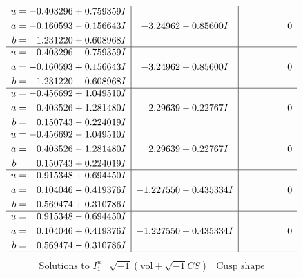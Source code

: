 \documentclass[1p]{elsarticle_modified}
\theoremstyle{definition}
\newcommand{\I}{\sqrt{-1}}
\begin{document}
$$\begin{array}{c|c|c}
\begin{aligned}
u &= -0.403296 + 0.759359 I \\
a &= -0.160593 - 0.156643 I \\
b &= \phantom{-}1.231220 + 0.608968 I\end{aligned}
 & -3.24962 - 0.85600 I & \phantom{-0.000000 } 0 \\ \hline\begin{aligned}
u &= -0.403296 - 0.759359 I \\
a &= -0.160593 + 0.156643 I \\
b &= \phantom{-}1.231220 - 0.608968 I\end{aligned}
 & -3.24962 + 0.85600 I & \phantom{-0.000000 } 0 \\ \hline\begin{aligned}
u &= -0.456692 + 1.049510 I \\
a &= \phantom{-}0.403526 + 1.281480 I \\
b &= \phantom{-}0.150743 - 0.224019 I\end{aligned}
 & \phantom{-}2.29639 - 0.22767 I & \phantom{-0.000000 } 0 \\ \hline\begin{aligned}
u &= -0.456692 - 1.049510 I \\
a &= \phantom{-}0.403526 - 1.281480 I \\
b &= \phantom{-}0.150743 + 0.224019 I\end{aligned}
 & \phantom{-}2.29639 + 0.22767 I & \phantom{-0.000000 } 0 \\ \hline\begin{aligned}
u &= \phantom{-}0.915348 + 0.694450 I \\
a &= \phantom{-}0.104046 - 0.419376 I \\
b &= \phantom{-}0.569474 + 0.310786 I\end{aligned}
 & -1.227550 - 0.435334 I & \phantom{-0.000000 } 0 \\ \hline\begin{aligned}
u &= \phantom{-}0.915348 - 0.694450 I \\
a &= \phantom{-}0.104046 + 0.419376 I \\
b &= \phantom{-}0.569474 - 0.310786 I\end{aligned}
 & -1.227550 + 0.435334 I & \phantom{-0.000000 } 0\\
 \hline 
 \end{array}$$\newpage$$\begin{array}{c|c|c}  
\text{Solutions to }I^u_{1}& \I (\text{vol} + \sqrt{-1}CS) & \text{Cusp shape}\\

\end{array}$$
\end{document}
